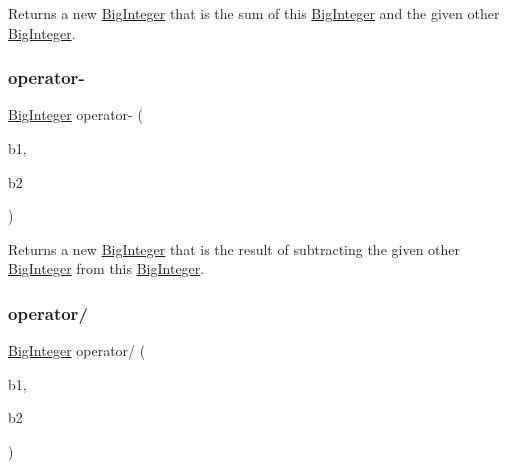 Returns a new \mbox{\hyperlink{classBigInteger}{Big\+Integer}} that is the sum of this \mbox{\hyperlink{classBigInteger}{Big\+Integer}} and the given other \mbox{\hyperlink{classBigInteger}{Big\+Integer}}. 

\mbox{\label{classBigInteger_ade6e91641d142240dc488b015c75504e}} 
\subsubsection{\texorpdfstring{operator-\/}{operator-}}
{\footnotesize\ttfamily \mbox{\hyperlink{classBigInteger}{Big\+Integer}} operator-\/ (\begin{DoxyParamCaption}\item[{const \mbox{\hyperlink{classBigInteger}{Big\+Integer}} \&}]{b1,  }\item[{const \mbox{\hyperlink{classBigInteger}{Big\+Integer}} \&}]{b2 }\end{DoxyParamCaption})\hspace{0.3cm}{\ttfamily [friend]}}



Returns a new \mbox{\hyperlink{classBigInteger}{Big\+Integer}} that is the result of subtracting the given other \mbox{\hyperlink{classBigInteger}{Big\+Integer}} from this \mbox{\hyperlink{classBigInteger}{Big\+Integer}}. 

\mbox{\label{classBigInteger_aa472efac72a9e7c868073119accefe94}} 
\subsubsection{\texorpdfstring{operator/}{operator/}}
{\footnotesize\ttfamily \mbox{\hyperlink{classBigInteger}{Big\+Integer}} operator/ (\begin{DoxyParamCaption}\item[{const \mbox{\hyperlink{classBigInteger}{Big\+Integer}} \&}]{b1,  }\item[{const \mbox{\hyperlink{classBigInteger}{Big\+Integer}} \&}]{b2 }\end{DoxyParamCaption})\hspace{0.3cm}{\ttfamily [friend]}}



